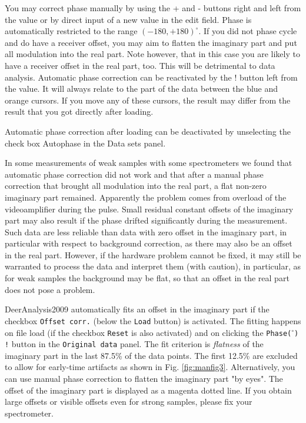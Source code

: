 \documentclass{article}
\begin{document}
You may correct phase manually by using the {\ttfamily +} and {\ttfamily -} buttons right and left from the value or by direct input of a new value in the edit field. Phase is automatically restricted to the range $(-180,+180)^\circ$. If you did not phase cycle
and do have a receiver offset, you may aim to flatten the imaginary part and
put all modulation into the real part. Note however, that in this case you are
likely to have a receiver offset in the real part, too. This will be detrimental to
data analysis. Automatic phase correction can be reactivated by the {\ttfamily !} button left from the value. It will always relate to the part of the data between the blue and orange cursors. If you move any of these cursors, the result may differ from the result that you got directly after loading.

Automatic phase correction after loading can be deactivated by unselecting
the check box {\ttfamily Autophase} in the {\ttfamily Data sets} panel.

In some measurements of weak samples with some spectrometers we found that automatic phase correction did not work and that after a manual phase correction that brought all modulation into the real part, a flat non-zero imaginary part remained. Apparently the problem comes from overload of the videoamplifier during the pulse. Small residual constant offsets of the imaginary part may also result if the phase drifted significantly during the measurement. Such data are less reliable than data with zero offset in the imaginary part, in particular with respect to background correction, as there may also be an offset in the real part. However, if the hardware problem cannot be fixed, it may still be warranted to process the data and interpret them (with caution), in particular, as for weak samples the background may be flat, so that an offset in the real part does not pose a problem.

DeerAnalysis2009 automatically fits an offset in the imaginary part if the checkbox \texttt{Offset corr.} (below the \texttt{Load} button) is activated. The fitting happens on file load (if the checkbox \texttt{Reset} is also activated) and on clicking the \texttt{Phase($^{\circ}$) !} button in the \texttt{Original data} panel. The fit criterion is \emph{flatness} of the imaginary part in the last 87.5\% of the data points. The first 12.5\% are excluded to allow for early-time artifacts as shown in Fig. \ref{fig:manfig3}. Alternatively, you can use manual phase correction to flatten the imaginary part "by eyes". The offset of the imaginary part is displayed as a magenta dotted line. If you obtain large offsets or visible offsets even for strong samples, please fix your spectrometer.
\end{document}
